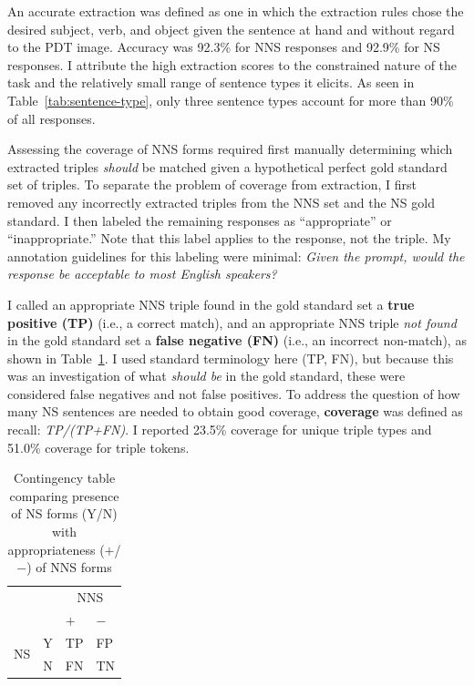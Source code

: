 An accurate extraction was defined as one in which the extraction rules chose the desired subject, verb, and object given the sentence at hand and without regard to the PDT image. Accuracy was 92.3\% for NNS responses and 92.9\% for NS responses. I attribute the high extraction scores to the constrained nature of the task and the relatively small range of sentence types it elicits. As seen in Table~\ref{tab:sentence-type}, only three sentence types account for more than 90\% of all responses. 

Assessing the coverage of NNS forms required first manually determining which extracted triples \textit{should} be matched given a hypothetical perfect gold standard set of triples. To separate the problem of coverage from extraction, I first removed any incorrectly extracted triples from the NNS set and the NS gold standard. I then labeled the remaining responses as ``appropriate'' or ``inappropriate.'' Note that this label applies to the response, not the triple. My annotation guidelines for this labeling were minimal: \textit{Given the prompt, would the response be acceptable to most English speakers?} 

I called an appropriate NNS triple found in the gold standard set a \textbf{true positive (TP)} (i.e., a correct match), and an appropriate NNS triple \textit{not found} in the gold standard set a \textbf{false negative (FN)} (i.e., an incorrect non-match), as shown in Table~\ref{tab:contingencies}. I used standard terminology here (TP, FN), but because this was an investigation of what \emph{should be} in the gold standard, these were considered
false negatives and not false positives.  To address the question of
how many NS sentences are needed to obtain good coverage, \textbf{coverage} was defined as recall: \textit{TP/(TP+FN)}. I reported 23.5\% coverage for unique triple
types and 51.0\% coverage for triple tokens.

\begin{table}[htb!]
\begin{center}
\begin{tabular}{|ll||l|l|}
  \hline
  & & \multicolumn{2}{c|}{NNS}\\
  & & $+$ & $-$ \\
  \hline
  \hline
  \multirow{2}{*}{NS} & Y & TP & FP \\
  \cline{2-4}
  & N & FN & TN\\
  \hline
\end{tabular}
\end{center}
\caption{Contingency table comparing presence of NS forms (Y/N) with
  appropriateness ($+$/$-$) of NNS forms}
\label{tab:contingencies}
\end{table}

